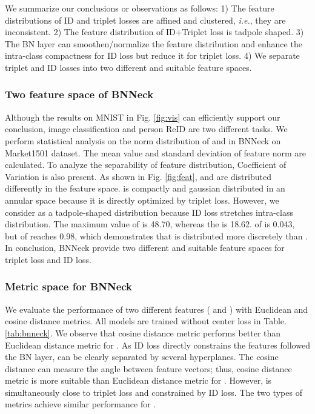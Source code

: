 \documentclass[journal]{IEEEtran}
\begin{document}
We summarize our conclusions or observations as follows:
1) The feature distributions of ID and triplet losses are affined and clustered, \emph{i.e.}, they are inconsistent.
2) The feature distribution of ID+Triplet loss is tadpole shaped.
3) The BN layer can smoothen/normalize the feature distribution and enhance the intra-class compactness for ID loss but reduce it for triplet loss.
4) We separate triplet and ID losses into two different and suitable feature spaces.


\subsubsection{Two feature space of BNNeck}

Although the results on MNIST in Fig. \ref{fig:vis} can efficiently support our conclusion, image classification and person ReID are two different tasks. We perform statistical analysis on the norm distribution of  and  in BNNeck on Market1501 dataset.
The mean value  and standard deviation  of feature norm are calculated.
To analyze the separability of feature distribution, Coefficient of Variation  is also present.
As shown in Fig. \ref{fig:feat},  and  are distributed differently in the feature space.
 is compactly and gaussian distributed in an annular space because it is directly optimized by triplet loss.
However, we consider  as a tadpole-shaped distribution because ID loss stretches intra-class distribution.
The maximum value of  is 48.70, whereas the  is 18.62.
 of  is 0.043, but  of  reaches 0.98, which demonstrates that  is distributed more discretely than .
In conclusion, BNNeck provide two different and suitable feature spaces for triplet loss and ID loss.

\subsubsection{Metric space for BNNeck}

We evaluate the performance of two different features ( and ) with Euclidean and cosine distance metrics.
All models are trained without center loss in Table. \ref{tab:bnneck}.
We observe that cosine distance metric performs better than Euclidean distance metric for .
As ID loss directly constrains the features followed the BN layer,  can be clearly separated by several hyperplanes.
The cosine distance can measure the angle between feature vectors; thus, cosine distance metric is more suitable than Euclidean distance metric for .
However,  is simultaneously close to triplet loss and constrained by ID loss. The two types of metrics achieve similar performance for .
\end{document}
